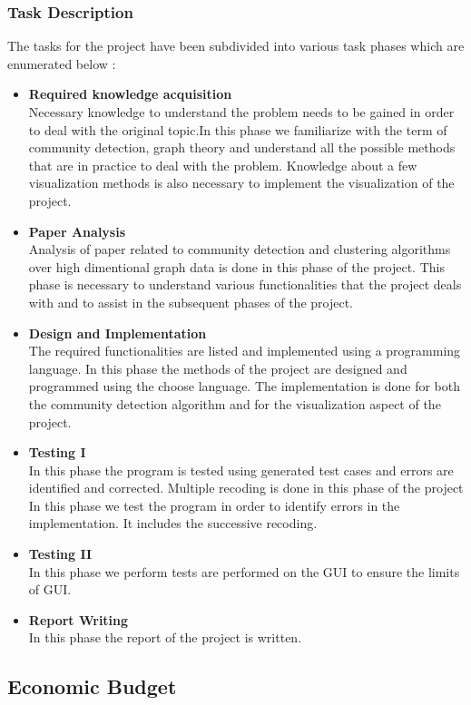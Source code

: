 \subsubsection{Task Description}
The tasks for the project have been subdivided into various task phases which are enumerated below : 
\begin{itemize}
\item \textbf{Required knowledge acquisition}\\
Necessary knowledge to understand the problem needs to be gained in order to deal with the original topic.In this phase we familiarize with the term of community detection, graph theory and understand all the possible methods that are in practice to deal with the problem. Knowledge about a few visualization methods is also necessary to implement the visualization of the project.
\item \textbf{Paper Analysis}\\ 
Analysis of paper related to community detection and clustering algorithms over high dimentional graph data is done in this phase of the project. This phase is necessary to understand various functionalities that the project deals with and to assist in the subsequent phases of the project.

\item \textbf{Design and Implementation} \\
The required functionalities are listed and implemented using a programming language. In this phase the methods of the project are designed and programmed using the choose language. 
The implementation is done for both the community detection algorithm and for the visualization aspect of the project.
\item \textbf{Testing I}\\
In this phase the program is tested using generated test cases and errors are identified and corrected. Multiple recoding is done in this phase of the project
In this phase we test the program in order to identify errors in
the implementation. It includes the successive recoding.
\item \textbf{Testing II}\\
In this phase we perform tests are performed on the GUI to ensure the limits of GUI. 
\item \textbf{Report Writing}\\
In this phase the report of the project is written.
\end{itemize} 
\subsection{Economic Budget}

